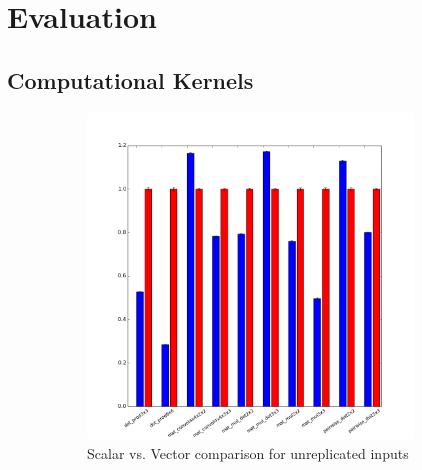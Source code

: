 \section{Evaluation}\label{sec:eval}


\subsection{Computational Kernels}
\begin{figure}
    \begin{subfigure}{0.3\textwidth}
        \includegraphics[width=0.95\textwidth]{figures/graphs/DataUnreplicatedENC+RUN.png}
        \caption{Scalar vs. Vector comparison for unreplicated inputs}\label{fig:ml-kernels-unrepl}
    \end{subfigure}
    \begin{subfigure}{0.3\textwidth}

\end{subfigure}
\end{figure}
